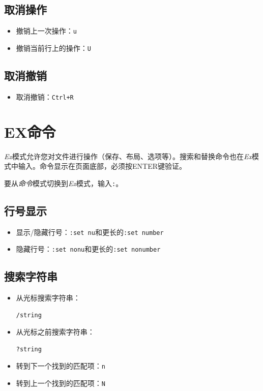 \documentclass[12pt,a4paper,twoside]{ctexbook}
\begin{document}
\subsection{取消操作}

\begin{itemize}
    \item 撤销上一次操作：\texttt{u}
    \item 撤销当前行上的操作：\texttt{U}
\end{itemize}

\subsection{取消撤销}

\begin{itemize}
    \item 取消撤销：\texttt{Ctrl+R}
\end{itemize}

\section{EX命令}

\textit{Ex}模式允许您对文件进行操作（保存、布局、选项等）。搜索和替换命令也在\textit{Ex}模式中输入。命令显示在页面底部，必须按ENTER键验证。

要从\textit{命令}模式切换到\textit{Ex}模式，输入\texttt{:}。

\subsection{行号显示}

\begin{itemize}
    \item 显示/隐藏行号：\texttt{:set nu}和更长的\texttt{:set number}
    \item 隐藏行号：\texttt{:set nonu}和更长的\texttt{:set nonumber}
\end{itemize}

\subsection{搜索字符串}

\begin{itemize}
    \item 从光标搜索字符串：
    \begin{verbatim}
/string
    \end{verbatim}
    \item 从光标之前搜索字符串：
    \begin{verbatim}
?string
    \end{verbatim}
    \item 转到下一个找到的匹配项：\texttt{n}
    \item 转到上一个找到的匹配项：\texttt{N}
\end{itemize}
\end{document}
